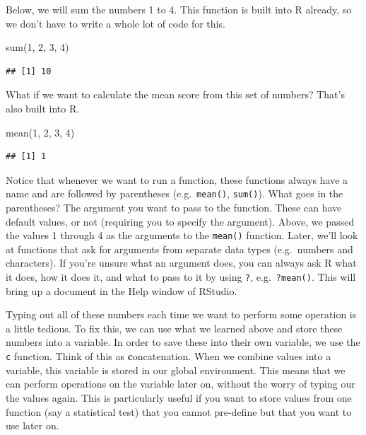 \documentclass[
]{book}
\newenvironment{Shaded}{\begin{snugshade}}{\end{snugshade}}
\newcommand{\DecValTok}[1]{\textcolor[rgb]{0.00,0.00,0.81}{#1}}
\newcommand{\FunctionTok}[1]{\textcolor[rgb]{0.00,0.00,0.00}{#1}}
\newcommand{\NormalTok}[1]{#1}
\begin{document}
Below, we will sum the numbers 1 to 4. This function is built into R already, so we don't have to write a whole lot of code for this.

\begin{Shaded}
\begin{Highlighting}[]
\FunctionTok{sum}\NormalTok{(}\DecValTok{1}\NormalTok{, }\DecValTok{2}\NormalTok{, }\DecValTok{3}\NormalTok{, }\DecValTok{4}\NormalTok{)}
\end{Highlighting}
\end{Shaded}

\begin{verbatim}
## [1] 10
\end{verbatim}

What if we want to calculate the mean score from this set of numbers? That's also built into R.

\begin{Shaded}
\begin{Highlighting}[]
\FunctionTok{mean}\NormalTok{(}\DecValTok{1}\NormalTok{, }\DecValTok{2}\NormalTok{, }\DecValTok{3}\NormalTok{, }\DecValTok{4}\NormalTok{)}
\end{Highlighting}
\end{Shaded}

\begin{verbatim}
## [1] 1
\end{verbatim}

Notice that whenever we want to run a function, these functions always have a name and are followed by parentheses (e.g.~\texttt{mean()}, \texttt{sum()}). What goes in the parentheses? The argument you want to pass to the function. These can have default values, or not (requiring you to specify the argument). Above, we passed the values 1 through 4 as the arguments to the \texttt{mean()} function. Later, we'll look at functions that ask for arguments from separate data types (e.g.~numbers and characters). If you're unsure what an argument does, you can always ask R what it does, how it does it, and what to pass to it by using \texttt{?}, e.g.~\texttt{?mean()}. This will bring up a document in the Help window of RStudio.

Typing out all of these numbers each time we want to perform some operation is a little tedious. To fix this, we can use what we learned above and store these numbers into a variable. In order to save these into their own variable, we use the \texttt{c} function. Think of this as \textbf{c}oncatenation. When we combine values into a variable, this variable is stored in our global environment. This means that we can perform operations on the variable later on, without the worry of typing our the values again. This is particularly useful if you want to store values from one function (say a statistical test) that you cannot pre-define but that you want to use later on.
\end{document}
